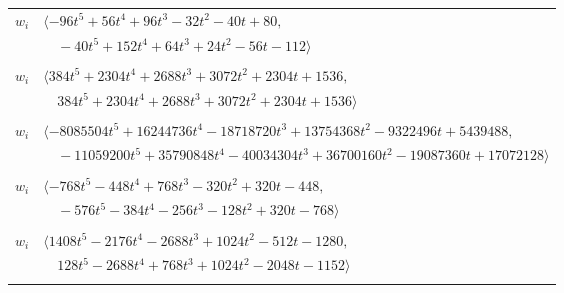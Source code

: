 \documentclass[11pt]{article}
\begin{document}
\begin{longtable}{@{}ll@{}}
$w_i$ & $\langle -96t^{5}+56t^{4}+96t^{3}-32t^{2}-40t+80,$\\
 & $\quad -40t^{5}+152t^{4}+64t^{3}+24t^{2}-56t-112\rangle$\\
\addlinespace[2pt]
\multicolumn{2}{@{}p{0.97\textwidth}@{}}{$i=53$, $D_i=64$, $\rho_{ij}$: $8{:}2, \allowbreak 19{:}2, \allowbreak 20{:}2, \allowbreak 23{:}2, \allowbreak 27{:}2, \allowbreak 35{:}2, \allowbreak 57{:}2$}\\
$w_i$ & $\langle 384t^{5}+2304t^{4}+2688t^{3}+3072t^{2}+2304t+1536,$\\
 & $\quad 384t^{5}+2304t^{4}+2688t^{3}+3072t^{2}+2304t+1536\rangle$\\
\addlinespace[2pt]
\multicolumn{2}{@{}p{0.97\textwidth}@{}}{$i=54$, $D_i=8192$, $\rho_{ij}$: $6{:}1, \allowbreak 7{:}1, \allowbreak 12{:}2, \allowbreak 16{:}2, \allowbreak 20{:}2, \allowbreak 21{:}2, \allowbreak 22{:}2, \allowbreak 23{:}1, \allowbreak 33{:}2, \allowbreak 40{:}1, \allowbreak 46{:}1, \allowbreak 50{:}2, \allowbreak 63{:}2$}\\
$w_i$ & $\langle -8085504t^{5}+16244736t^{4}-18718720t^{3}+13754368t^{2}-9322496t+5439488,$\\
 & $\quad -11059200t^{5}+35790848t^{4}-40034304t^{3}+36700160t^{2}-19087360t+17072128\rangle$\\
\addlinespace[2pt]
\multicolumn{2}{@{}p{0.97\textwidth}@{}}{$i=55$, $D_i=64$, $\rho_{ij}$: $9{:}1, \allowbreak 18{:}2, \allowbreak 24{:}2, \allowbreak 27{:}1, \allowbreak 31{:}1, \allowbreak 34{:}2, \allowbreak 35{:}1, \allowbreak 37{:}2, \allowbreak 59{:}1$}\\
$w_i$ & $\langle -768t^{5}-448t^{4}+768t^{3}-320t^{2}+320t-448,$\\
 & $\quad -576t^{5}-384t^{4}-256t^{3}-128t^{2}+320t-768\rangle$\\
\addlinespace[2pt]
\multicolumn{2}{@{}p{0.97\textwidth}@{}}{$i=56$, $D_i=128$, $\rho_{ij}$: $5{:}1, \allowbreak 18{:}1, \allowbreak 22{:}1, \allowbreak 23{:}1, \allowbreak 35{:}2, \allowbreak 43{:}2, \allowbreak 44{:}2, \allowbreak 52{:}1, \allowbreak 58{:}2$}\\
$w_i$ & $\langle 1408t^{5}-2176t^{4}-2688t^{3}+1024t^{2}-512t-1280,$\\
 & $\quad 128t^{5}-2688t^{4}+768t^{3}+1024t^{2}-2048t-1152\rangle$\\
\addlinespace[2pt]
\multicolumn{2}{@{}p{0.97\textwidth}@{}}{$i=57$, $D_i=32$, $\rho_{ij}$: $4{:}1, \allowbreak 17{:}2, \allowbreak 20{:}2, \allowbreak 30{:}1, \allowbreak 40{:}2, \allowbreak 53{:}1$}\\

\end{longtable}
\end{document}

